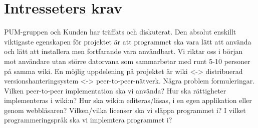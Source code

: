\section{Intresseters krav}
PUM-gruppen och Kunden har träffats och diskuterat. Den absolut enskillt viktigaste egenskapen för projektet är att programmet ska vara lätt att använda och lätt att installera men fortfarande vara användbart.  Vi riktar oss i början mot användare utan större datorvana som sammarbetar med runt 5-10 personer på samma wiki. En möjlig uppdelening på projektet är wiki <-> distribuerad versionshanteringsystem <-> peer-to-peer-nätverk. Några problem formuleringar. Vilken peer-to-peer implementation ska vi använda? Hur ska rättigheter implementeras i wiki:n? Hur ska wiki:n editeras/läsas, i en egen applikation eller genom webbläsaren? Vilken/vilka licenser ska vi släppa programmet i? I vilket programmeringspråk ska vi implemtera programmet i?
